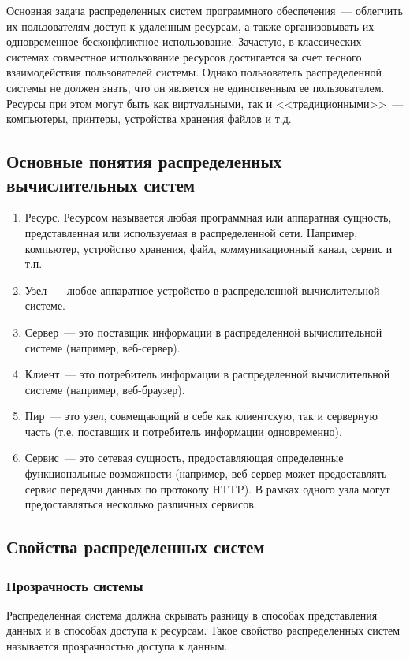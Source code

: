 Основная задача распределенных систем программного обеспечения~--- облегчить их пользователям доступ к удаленным ресурсам, а также организовывать их одновременное бесконфликтное использование. Зачастую, в классических системах совместное использование ресурсов достигается за счет тесного взаимодействия пользователей системы. Однако пользователь распределенной системы не должен знать, что он является не единственным ее пользователем. Ресурсы при этом могут быть как виртуальными, так и <<традиционными>>~--- компьютеры, принтеры, устройства хранения файлов и т.д.

\subsection{Основные понятия распределенных вычислительных систем}
\begin{enumerate}
\item Ресурс. Ресурсом называется любая программная или аппаратная сущность, представленная или используемая в распределенной сети. Например, компьютер, устройство хранения, файл, коммуникационный канал, сервис и т.п.
\item Узел~--- любое аппаратное устройство в распределенной вычислительной системе.
\item Сервер~--- это поставщик информации в распределенной вычислительной системе (например, веб-сервер).
\item Клиент~--- это потребитель информации в распределенной вычислительной системе (например, веб-браузер).
\item Пир~--- это узел, совмещающий в себе как клиентскую, так и серверную часть (т.е. поставщик и потребитель информации одновременно).
\item Сервис~--- это сетевая сущность, предоставляющая определенные функциональные возможности (например, веб-сервер может предоставлять сервис передачи данных по протоколу HTTP). В рамках одного узла могут предоставляться несколько различных сервисов.
\end{enumerate}

\subsection{Свойства распределенных систем}
\subsubsection{Прозрачность системы}
Распределенная система должна скрывать разницу в способах представления данных и в способах доступа к ресурсам. Такое свойство распределенных систем называется прозрачностью доступа к данным.


